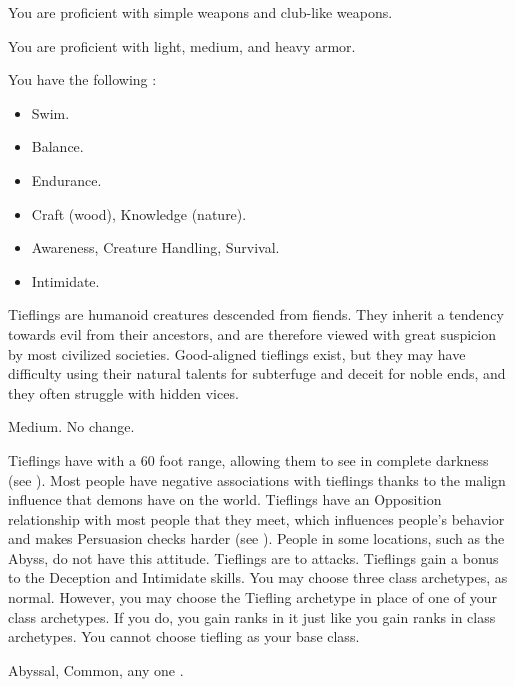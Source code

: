       You are proficient with simple weapons and club-like weapons.

      You are proficient with light, medium, and heavy armor.

      You have the following :
      \begin{itemize}
        \item {} Swim.
        \item {} Balance.
        \item {} Endurance.
        \item {} Craft (wood), Knowledge (nature).
        \item {} Awareness, Creature Handling, Survival.
        \item {} Intimidate.
      \end{itemize}


  Tieflings are humanoid creatures descended from fiends.
  They inherit a tendency towards evil from their ancestors, and are therefore viewed with great suspicion by most civilized societies.
  Good-aligned tieflings exist, but they may have difficulty using their natural talents for subterfuge and deceit for noble ends, and they often struggle with hidden vices.

   Medium.
   No change.
  \begin{itemize}
     Tieflings have  with a 60 foot range, allowing them to see in complete darkness (see ).
     Most people have negative associations with tieflings thanks to the malign influence that demons have on the world.
      Tieflings have an Opposition relationship with most people that they meet, which influences people's behavior and makes Persuasion checks harder (see ).
      People in some locations, such as the Abyss, do not have this attitude.
     Tieflings are  to \atFire attacks.
     Tieflings gain a  bonus to the Deception and Intimidate skills.
     You may choose three class archetypes, as normal.
      However, you may choose the Tiefling archetype in place of one of your class archetypes.
      If you do, you gain ranks in it just like you gain ranks in class archetypes.
      You cannot choose tiefling as your base class.
  \end{itemize}
   Abyssal, Common, any one .

